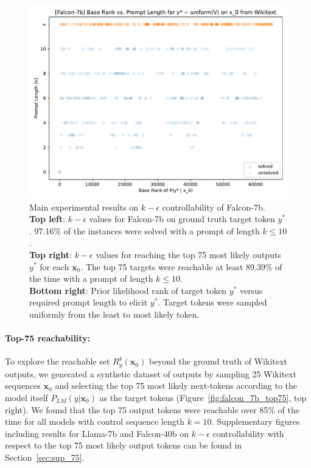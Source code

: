 \documentclass{article} %
\begin{document}
\begin{figure}[ht]
    \begin{minipage}[b]{0.48\textwidth}
        \caption{
            Main experimental results on $k-\epsilon$ controllability of Falcon-7b. \\
            \textbf{Top left}: $k-\epsilon$ values for Falcon-7b on ground truth target token $y^*$. 97.16\% of the instances were solved with a prompt of length $k\leq 10$. \label{fig:falcon_7b_k-e} \\
            \textbf{Top right}: $k-\epsilon$ values for reaching the top 75 most likely outputs $y^*$ for each $\mathbf x_0$. The top 75 targets were reachable at least 89.39\% of the time with a prompt of length $k\leq 10$.
            \label{fig:falcon_7b_top75} \\
            \textbf{Bottom right}: Prior likelihood rank of target token $y^*$ versus required prompt length to elicit $y^*$. Target tokens were sampled uniformly from the least to most likely token.
            \label{fig:deep_falcon_rank_k}
        }
    \end{minipage}
    \hfill
    \begin{minipage}[b]{0.48\textwidth}
        \includegraphics[width=\textwidth]{figs/deep1_falcon7b_base_rank_vs_prompt_length.pdf}
    \end{minipage}
\end{figure}


\paragraph{Top-75 reachability: } To explore the reachable set $R_y^k(\mathbf x_0)$ beyond the ground truth of Wikitext outputs, we generated a synthetic dataset of outputs by sampling 25 Wikitext sequences $\mathbf x_0$ and selecting the top 75 most likely next-tokens according to the model itself $P_{LM}(y | \mathbf x_0)$ as the target tokens (Figure~\ref{fig:falcon_7b_top75}, top right). We found that the top 75 output tokens were reachable over 85\% of the time for all models with control sequence length $k=10$. Supplementary figures including results for Llama-7b and Falcon-40b on $k-\epsilon$ controllability with respect to the top 75 most likely output tokens can be found in Section~\ref{sec:sup_75}.
\end{document}
